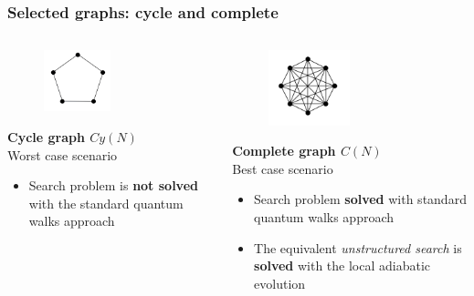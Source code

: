 \documentclass{beamer}
\newcommand{\bb}[1]{\textbf{\textcolor{darkish_blue}{#1}}}
\begin{document}
\begin{frame}
\frametitle{Selected graphs: cycle and complete}



\begin{columns}
	\begin{column}[T]{0.4\textwidth}
	\vspace{-0.7cm}
		\begin{figure}
			\centering
			\includegraphics[width=0.5\textwidth]{cycle.png}
		\end{figure}
	\vspace{-0.5cm}
	\bb{Cycle graph $Cy(N)$}\\
	Worst case scenario
	\begin{itemize}
		\item Search problem is \bb{not solved} with the standard quantum walks approach
	\end{itemize}
	\end{column}

	\begin{column}[T]{0.4\textwidth}
	\vspace{-0.7cm}
		\begin{figure}
			\centering
			\includegraphics[width=0.5\textwidth]{complete_graph.png}
		\end{figure}
	\vspace{-0.5cm}
	\bb{Complete graph $C(N)$}\\
	Best case scenario
	\vspace{0.3cm}
	\begin{itemize}
		\item Search problem \bb{solved} with standard quantum walks approach
		\item The equivalent \textit{unstructured search} is \bb{solved} with the local adiabatic evolution
	\end{itemize}
	\end{column}
\end{columns}

\end{frame}
\end{document}
